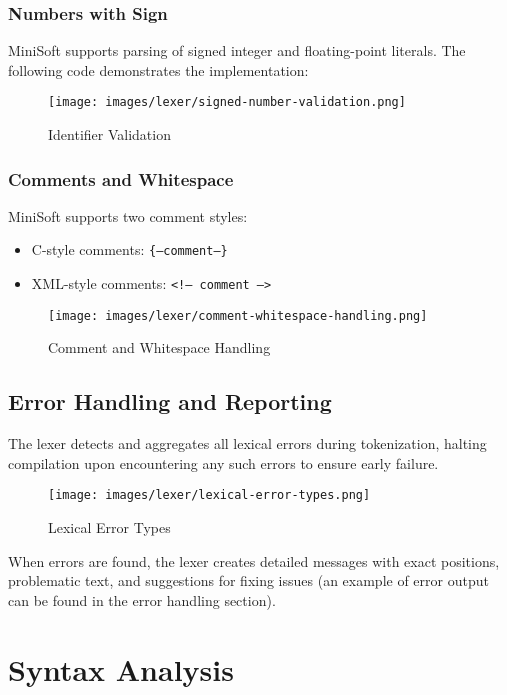 \documentclass[12pt,a4paper]{article}
\begin{document}
\subsubsection{Numbers with Sign}
MiniSoft supports parsing of signed integer and floating-point literals. The following code demonstrates the implementation:


\begin{figure}[H]
	\centering
	\texttt{[image: images/lexer/signed-number-validation.png]}
	\caption{Identifier Validation}
\end{figure}

\subsubsection{Comments and Whitespace}
MiniSoft supports two comment styles:
\begin{itemize}
	\item C-style comments: \texttt{\{--comment--\}}
	\item XML-style comments: \texttt{<!-- comment -->}
\end{itemize}


\begin{figure}[H]
	\centering
	\texttt{[image: images/lexer/comment-whitespace-handling.png]}
	\caption{Comment and Whitespace Handling}
\end{figure}

\subsection{Error Handling and Reporting}
The lexer detects and aggregates all lexical errors during tokenization, halting compilation upon encountering any such errors to ensure early failure.

\begin{figure}[H]
	\centering
	\texttt{[image: images/lexer/lexical-error-types.png]}
	\caption{Lexical Error Types}
\end{figure}

When errors are found, the lexer creates detailed messages with exact positions, problematic text, and suggestions for fixing issues (an example of error output can be found in the error handling section).

\section{Syntax Analysis}
\end{document}

